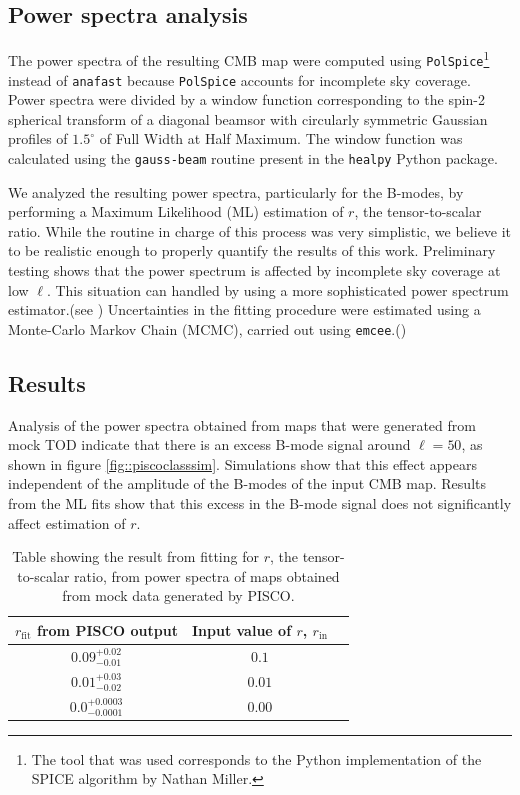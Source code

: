 \documentclass[a4paper,11pt]{article}
\begin{document}
\subsection{Power spectra analysis}

The power spectra of the resulting CMB map were computed using \texttt{PolSpice}\footnote{The tool that was used corresponds to the Python implementation of the SPICE algorithm by Nathan Miller.} instead of \texttt{anafast} because \texttt{PolSpice} accounts for incomplete sky coverage. Power spectra were divided by a window function corresponding to the spin-2 spherical transform of a diagonal beamsor with circularly symmetric Gaussian profiles of $1.5^\circ$ of Full Width at Half Maximum. The window function was calculated using the \texttt{gauss-beam} routine present in the \texttt{healpy} Python package.

We analyzed the resulting power spectra, particularly for the B-modes, by performing a Maximum Likelihood (ML) estimation of $r$, the tensor-to-scalar ratio. While the routine in charge of this process was very simplistic, we believe it to be realistic enough to properly quantify the results of this work. Preliminary testing shows that the power spectrum is affected by incomplete sky coverage at low $\ell$. This situation can handled by using a more sophisticated power spectrum estimator.(see \cite{2015ApJ...814..103W} ) Uncertainties in the fitting procedure were estimated using a Monte-Carlo Markov Chain (MCMC), carried out using \texttt{emcee}.(\cite{emcee})

\subsection{Results}

Analysis of the power spectra obtained from maps that were generated from mock TOD indicate that there is an excess B-mode signal around $\ell=50$, as shown in figure \ref{fig::piscoclasssim}. Simulations show that this effect appears independent of the amplitude of the B-modes of the input CMB map. Results from the ML fits show that this excess in the B-mode signal does not significantly affect estimation of $r$.

\begin{table}[tbp]
	\centering
	\begin{tabular}{|c|c|c|}
		\hline
		$r_\mathrm{fit}$ from PISCO output & Input value of $r$, $r_{\mathrm{in}}$ \\
		\hline
     	$0.09^{+0.02}_{-0.01}$ & $0.1$ \\
	    $0.01^{+0.03}_{-0.02}$ & $0.01$ \\
	    $0.0^{+0.0003}_{-0.0001}$ & $0.00$ \\ 
		\hline
	\end{tabular}
	\caption{Table showing the result from fitting for $r$, the tensor-to-scalar ratio, from power spectra of maps obtained from mock data generated by PISCO. }
\end{table}
\end{document}
